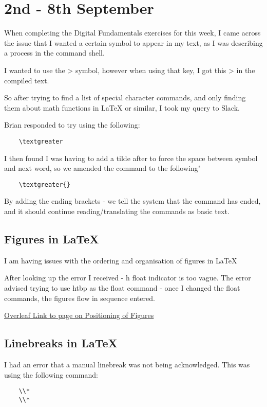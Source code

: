 \documentclass{article}
\begin{document}
\section{2nd - 8th September}
\label{Error: LaTeX and Symbols}
When completing the Digital Fundamentals exercises for this week, I came across the issue that I wanted a certain symbol to appear in my text, as I was describing a process in the command shell. 

I wanted to use the \textgreater{} symbol, however when using that key, I got this > in the compiled text. 

So after trying to find a list of special character commands, and only finding them about math functions in LaTeX or similar, I took my query to Slack.

Brian responded to try using the following: 
\begin{verbatim}
    \textgreater
\end{verbatim}

I then found I was having to add a tilde after to force the space between symbol and next word, so we amended the command to the following"
\begin{verbatim}
    \textgreater{}
\end{verbatim}

By adding the ending brackets - we tell the system that the command has ended, and it should continue reading/translating the commands as basic text.

\subsection{Figures in LaTeX}
\label{Error: Figures in LaTeX}

I am having issues with the ordering and organisation of figures in LaTeX

After looking up the error I received - h float indicator is too vague. The error advised trying to use htbp as the float command - once I changed the float commands, the figures flow in sequence entered.

\href{https://www.overleaf.com/learn/latex/Positioning_of_Figures}{Overleaf Link to page on Positioning of Figures}

\subsection{Linebreaks in LaTeX}
\label{Error: Linebreaks in LaTeX}

I had an error that a manual linebreak was not being acknowledged. This was using the following command:
\begin{verbatim}
    \\*
    \\*
\end{verbatim}
\end{document}

